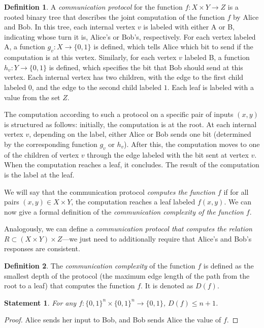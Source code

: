 \documentclass[12pt,sans]{article}
\newcommand{\bits}{\{0,1\}}
\theoremstyle{definition}
\newtheorem{definition}{Definition}[section]
\theoremstyle{plain}
\newtheorem{statement}{Statement}[section]
\theoremstyle{remark}
\begin{document}
\begin{definition}
    A \emph{communication protocol} for the function $f: X \times Y \to Z$ is a rooted binary tree that describes the joint computation of the function $f$ by Alice and Bob. In this tree, each internal vertex $v$ is labeled with either A or B, indicating whose turn it is, Alice's or Bob's, respectively. For each vertex labeled A, a function $g_v: X \to \bits$ is defined, which tells Alice which bit to send if the computation is at this vertex. Similarly, for each vertex $v$ labeled B, a function $h_v: Y \to \bits$ is defined, which specifies the bit that Bob should send at this vertex. Each internal vertex has two children, with the edge to the first child labeled $0$, and the edge to the second child labeled $1$. Each leaf is labeled with a value from the set $Z$.

    The computation according to such a protocol on a specific pair of inputs $(x,y)$ is structured as follows: initially, the computation is at the root. At each internal vertex $v$, depending on the label, either Alice or Bob sends one bit (determined by the corresponding function $g_v$ or $h_v$). After this, the computation moves to one of the children of vertex $v$ through the edge labeled with the bit sent at vertex $v$. When the computation reaches a leaf, it concludes. The result of the computation is the label at the leaf.
\end{definition}

We will say that the communication protocol \emph{computes the function $f$} if for all pairs $(x,y) \in X \times Y$, the computation reaches a leaf labeled $f(x,y)$. We can now give a formal definition of the \emph{communication complexity of the function $f$}.

Analogously, we can define a \emph{communication protocol that computes the relation $R \subset (X \times Y) \times Z$}—we just need to additionally require that Alice's and Bob's responses are consistent.

\begin{definition}
    The \emph{communication complexity} of the function $f$ is defined as the smallest depth of the protocol (the maximum edge length of the path from the root to a leaf) that computes the function $f$. It is denoted as $D(f)$.
\end{definition}

\begin{statement}
    For any $f: \{0,1\}^n \times\{0,1\}^n \to \bits$, $D(f) \le n + 1$.
\end{statement}
\begin{proof}
    Alice sends her input to Bob, and Bob sends Alice the value of $f$.
\end{proof}
\end{document}

